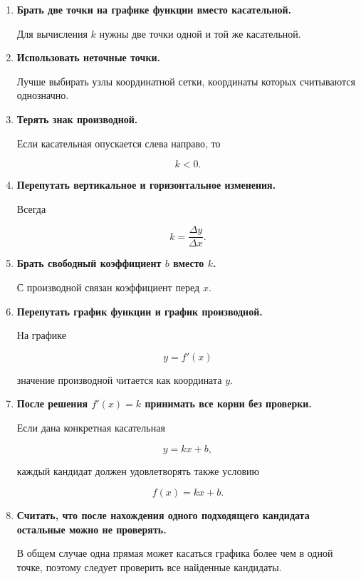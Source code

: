 \documentclass[a4paper,12pt]{article}
\begin{document}
\begin{enumerate}

  \item
  \textbf{Брать две точки на графике функции вместо касательной.}

  Для вычисления \(k\) нужны две точки одной и той же касательной.

  \item
  \textbf{Использовать неточные точки.}

  Лучше выбирать узлы координатной сетки, координаты которых считываются
  однозначно.

  \item
  \textbf{Терять знак производной.}

  Если касательная опускается слева направо, то

  \[
  k<0.
  \]

  \item
  \textbf{Перепутать вертикальное и горизонтальное изменения.}

  Всегда

  \[
  k=
  \frac{\Delta y}{\Delta x}.
  \]

  \item
  \textbf{Брать свободный коэффициент \(b\) вместо \(k\).}

  С производной связан коэффициент перед \(x\).

  \item
  \textbf{Перепутать график функции и график производной.}

  На графике

  \[
  y=f'(x)
  \]

  значение производной читается как координата \(y\).

  \item
  \textbf{После решения \(f'(x)=k\) принимать все корни без проверки.}

  Если дана конкретная касательная

  \[
  y=kx+b,
  \]

  каждый кандидат должен удовлетворять также условию

  \[
  f(x)=kx+b.
  \]

  \item
  \textbf{Считать, что после нахождения одного подходящего кандидата
  остальные можно не проверять.}

  В общем случае одна прямая может касаться графика более чем в одной точке,
  поэтому следует проверить все найденные кандидаты.

\end{enumerate}
\end{document}
